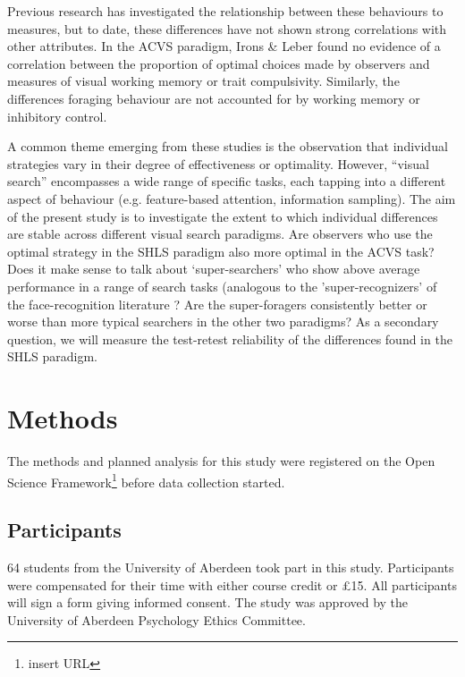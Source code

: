\documentclass[]{rsos}%
\begin{document}
Previous research has investigated the relationship between these behaviours to  measures, but to date, these differences have not shown strong correlations with other attributes. In the ACVS paradigm, Irons \& Leber found no evidence of a correlation between the proportion of optimal choices made by observers and measures of visual working memory or trait compulsivity\cite{irons-leber2016}. Similarly, the differences foraging behaviour are not accounted for by working memory or inhibitory control\cite{johannesson2017}. 

A common theme emerging from these studies is the observation that individual strategies vary in their degree of effectiveness or optimality. However, ``visual search'' encompasses a wide range of specific tasks, each tapping into a different aspect of behaviour (e.g. feature-based attention, information sampling). The aim of the present study is to investigate the extent to which individual differences are stable across different visual search paradigms. Are observers who use the optimal strategy in the SHLS paradigm also more optimal in the ACVS task? Does it make sense to talk about `super-searchers' who show above average performance in a range of search tasks (analogous to the 'super-recognizers' of the face-recognition literature \cite{russell2009}? Are the super-foragers consistently better or worse than more typical searchers in the other two paradigms? As a secondary question, we will measure the test-retest reliability of the differences found in the SHLS paradigm. 

\section{Methods}

The methods and planned analysis for this study were registered on the Open Science Framework\footnote{insert URL} before data collection started.

\subsection{Participants}
64 students from the University of Aberdeen took part in this study. Participants were compensated for their time with either  course credit or \pounds 15. All participants will sign a form giving informed consent. The study was approved by the University of Aberdeen Psychology Ethics Committee. 
\end{document}
